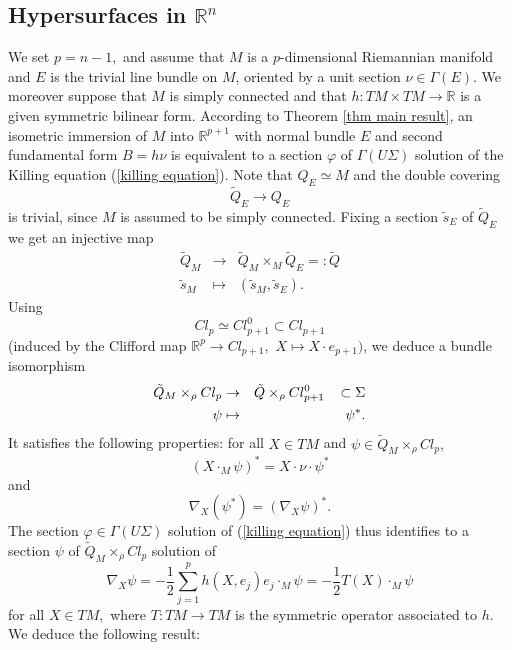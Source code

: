 \documentclass{amsart}
\begin{document}
\subsection{Hypersurfaces in ${\mathbb{R}}^n$}
We set $p=n-1,$ and assume that $M$ is a $p$-dimensional Riemannian manifold and $E$ is the trivial line bundle on $M$, oriented by a unit section $\nu\in \Gamma(E).$ We moreover suppose that $M$ is simply connected and that $h:TM\times TM\rightarrow {\mathbb{R}}$ is a given symmetric bilinear form. According to Theorem \ref{thm main result}, an isometric immersion of $M$ into ${\mathbb{R}}^{p+1}$ with normal bundle $E$ and second fundamental form $B=h\nu$ is equivalent to a section $\varphi$ of $\Gamma(U\Sigma)$ solution of the Killing equation (\ref{killing equation}). Note that $Q_E\simeq M$ and the double covering
$$\tilde{Q}_E\rightarrow Q_{E}$$
is trivial, since $M$ is assumed to be simply connected. Fixing a section $\tilde{s}_E$ of $\tilde{Q}_E$ we get an injective map
\begin{eqnarray*}
\tilde{Q}_M&\rightarrow &\tilde{Q}_M\times_M\tilde{Q}_E=:\tilde{Q}\\
\tilde{s}_M&\mapsto&(\tilde{s}_M,\tilde{s}_E).
\end{eqnarray*}
Using
$$Cl_p\simeq Cl^0_{p+1}\subset Cl_{p+1}$$
(induced by the Clifford map ${\mathbb{R}}^p\rightarrow Cl_{p+1},$ $X\mapsto X\cdot e_{p+1})$,  we deduce a bundle isomorphism
\begin{eqnarray}
\tilde{Q}_M\times_{\rho} Cl_p&\rightarrow& \tilde{Q}\times_{\rho} Cl^0_{p+1}\hspace{.3cm} \subset\Sigma\label{identif spineurs}\\
\psi&\mapsto&\psi^*.\nonumber
\end{eqnarray}
It satisfies the following properties: for all $X\in TM$ and $\psi\in \tilde{Q}_M\times_{\rho} Cl_p,$
$$(X\cdot_M\psi)^*=X\cdot\nu\cdot\psi^*$$
and
$$\nabla_X(\psi^*)=(\nabla_X\psi)^*.$$
The section $\varphi\in \Gamma(U\Sigma)$ solution of (\ref{killing equation}) thus identifies to a section $\psi$ of $\tilde{Q}_M\times_{\rho} Cl_p$ solution of
\begin{equation*}
\nabla_X\psi=-\frac{1}{2}\sum_{j=1}^ph(X,e_j)e_j\cdot_M\psi=-\frac{1}{2}T(X)\cdot_M\psi
\end{equation*}
for all $X\in TM,$ where $T:TM\rightarrow TM$ is the symmetric operator associated to $h.$ We deduce the following result:
\end{document}
